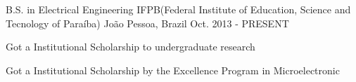 

\begin{cventries}

  \cventry
    {B.S. in Electrical Engineering} %
    {IFPB(Federal Institute of Education, Science and Tecnology of Paraíba)} %
    {João Pessoa, Brazil} %
    {Oct. 2013 - PRESENT} %
    {
      \begin{cvitems} %
        \item{ Got a Institutional Scholarship to undergraduate research}
        \item{ Got a Institutional Scholarship by the Excellence Program in Microelectronic}
      \end{cvitems}
    }

\end{cventries}
